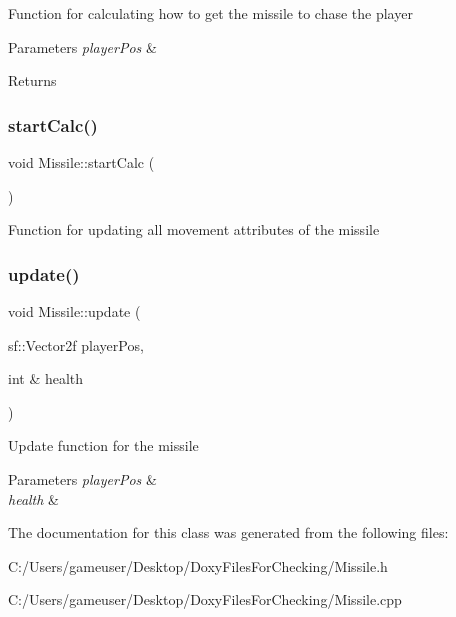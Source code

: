 Function for calculating how to get the missile to chase the player 


\begin{DoxyParams}{Parameters}
{\em player\+Pos} & \\
\hline
\end{DoxyParams}
\begin{DoxyReturn}{Returns}

\end{DoxyReturn}
\mbox{\label{class_missile_aa7d46b6d539ed741f55f5d9137bda2ff}} 
\subsubsection{\texorpdfstring{startCalc()}{startCalc()}}
{\footnotesize\ttfamily void Missile\+::start\+Calc (\begin{DoxyParamCaption}{ }\end{DoxyParamCaption})}



Function for updating all movement attributes of the missile 

\mbox{\label{class_missile_afd7036f6ab20eabb14920dfe0bc8944d}} 
\subsubsection{\texorpdfstring{update()}{update()}}
{\footnotesize\ttfamily void Missile\+::update (\begin{DoxyParamCaption}\item[{sf\+::\+Vector2f}]{player\+Pos,  }\item[{int \&}]{health }\end{DoxyParamCaption})}



Update function for the missile 


\begin{DoxyParams}{Parameters}
{\em player\+Pos} & \\
\hline
{\em health} & \\
\hline
\end{DoxyParams}


The documentation for this class was generated from the following files\+:\begin{DoxyCompactItemize}
\item 
C\+:/\+Users/gameuser/\+Desktop/\+Doxy\+Files\+For\+Checking/Missile.\+h\item 
C\+:/\+Users/gameuser/\+Desktop/\+Doxy\+Files\+For\+Checking/Missile.\+cpp\end{DoxyCompactItemize}
